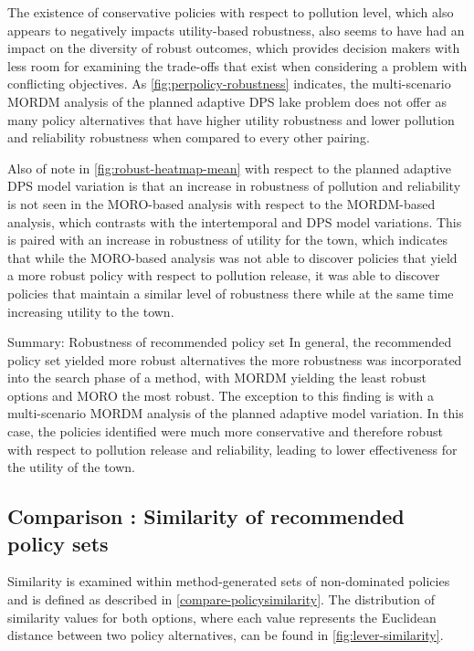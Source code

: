     The existence of conservative policies with respect to pollution level, which also appears to negatively impacts utility-based robustness, also seems to have had an impact on the diversity of robust outcomes, which provides decision makers with less room for examining the trade-offs that exist when considering a problem with conflicting objectives. As \cref{fig:perpolicy-robustness} indicates, the multi-scenario MORDM analysis of the planned adaptive DPS lake problem does not offer as many policy alternatives that have higher utility robustness and lower pollution and reliability robustness when compared to every other pairing. 

    Also of note in \cref{fig:robust-heatmap-mean} with respect to the planned adaptive DPS model variation is that an increase in robustness of pollution and reliability is not seen in the MORO-based analysis with respect to the MORDM-based analysis, which contrasts with the intertemporal and DPS model variations. This is paired with an increase in robustness of utility for the town, which indicates that while the MORO-based analysis was not able to discover policies that yield a more robust policy with respect to pollution release, it was able to discover policies that maintain a similar level of robustness there while at the same time increasing utility to the town. 
    
    \begin{comparisonbox}{Summary: Robustness of recommended policy set}
        In general, the recommended policy set yielded more robust alternatives the more robustness was incorporated into the search phase of a method, with MORDM yielding the least robust options and MORO the most robust. The exception to this finding is with a multi-scenario MORDM analysis of the planned adaptive model variation. In this case, the policies identified were much more conservative and therefore robust with respect to pollution release and reliability, leading to lower effectiveness for the utility of the town. 
    \end{comparisonbox}
    
    \subsection{Comparison \thecomparison : Similarity of recommended policy sets} 
    Similarity is examined within method-generated sets of non-dominated policies and is defined as described in \cref{compare-policysimilarity}. The distribution of similarity values for both options, where each value represents the Euclidean distance between two policy alternatives, can be found in \cref{fig:lever-similarity}. 

